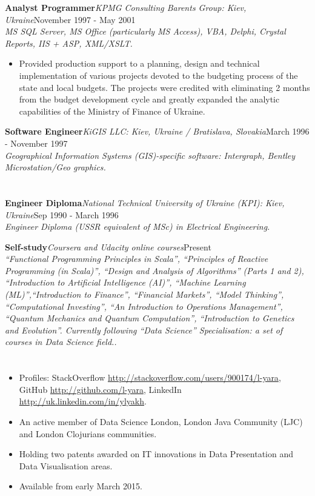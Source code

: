 \documentclass{res}
\newcommand{\jobdes}[4]{\needspace{3\baselineskip} %
{\noindent \bf #3\hspace{2ex}}{{\em \small #1}}{\hfill #2}\\{{\it \small #4.}}}
\newcommand{\osection}[1]{\section{\sc {\Large \textbf{#1}\\}} \vspace{0.30cm}}
\newif\ifFullVersion
\begin{document}
\begin{resume}
\jobdes {KPMG Consulting Barents Group: Kiev, Ukraine}{November 1997 - May 2001}{Analyst Programmer}
{MS SQL Server, MS Office (particularly MS Access), VBA, Delphi, Crystal Reports, IIS + ASP, XML/XSLT}
\begin{itemize}
 \item Provided production support to a planning, design and technical implementation of various projects devoted to the budgeting process of the state and local budgets.  The projects were credited with eliminating 2 months from the budget development cycle and greatly expanded the analytic capabilities of the Ministry of Finance of Ukraine.
\end{itemize}
\jobdes {KiGIS LLC: Kiev, Ukraine / Bratislava, Slovakia}{March 1996 - November 1997}{Software Engineer}
{Geographical Information Systems (GIS)-specific software: Intergraph, Bentley Microstation/Geo graphics}

\osection{EDUCATION}
\jobdes {National Technical University of Ukraine (KPI): Kiev, Ukraine}{Sep 1990 - March 1996}{Engineer Diploma}
 {Engineer Diploma (USSR equivalent of MSc) in Electrical Engineering}

\jobdes {Coursera and Udacity online courses}{Present}{Self-study}
{``Functional Programming Principles in Scala'', ``Principles of Reactive Programming (in Scala)'', ``Design and Analysis of Algorithms'' (Parts 1 and 2), ``Introduction to Artificial Intelligence (AI)'', ``Machine Learning (ML)'',``Introduction to Finance'', ``Financial Markets'', ``Model Thinking'', ``Computational Investing'', ``An Introduction to Operations Management'', ``Quantum Mechanics and Quantum Computation'', ``Introduction to Genetics and Evolution''. Currently following ``Data Science'' Specialisation: a set of courses in Data Science field.}

\osection{SPECIALS}
\vspace{0.20cm}
\begin{itemize}
 \item Profiles: StackOverflow \url{http://stackoverflow.com/users/900174/l-yara}, GitHub \url{http://github.com/l-yara}, LinkedIn \url{http://uk.linkedin.com/in/ylyakh}.
 \item An active member of Data Science London, London Java Community (LJC) and London Clojurians communities.
\ifFullVersion
 \item Sports: volleyball (former player of ``CBPhoto'' Irish Division 1 team, now playing in Kent amateur league), sailing (former pupil of Kiev Olympic School).
\else
\item Holding two patents awarded on IT innovations in Data Presentation and Data Visualisation areas.
\item Available from early March 2015.
\fi
\end{itemize}


\end{resume}
\end{document}

